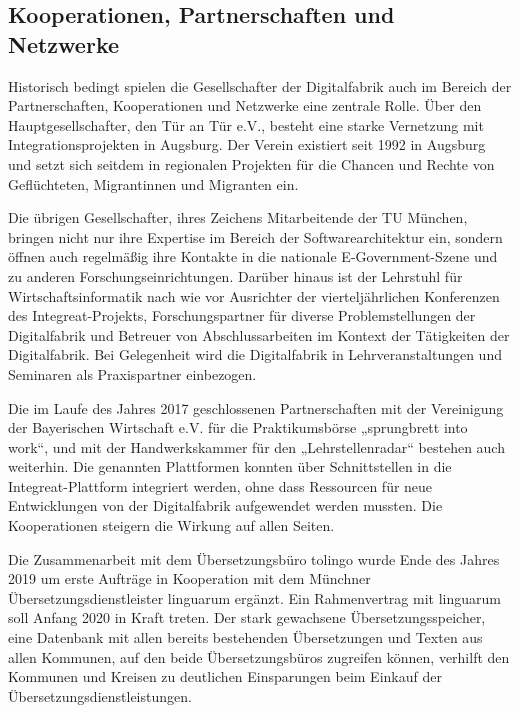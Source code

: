 \documentclass[12pt, a4paper]{article} %
\begin{document}
\hypertarget{kooperationen-partnerschaften-und-netzwerke}{%
\subsection{Kooperationen, Partnerschaften und
Netzwerke}\label{kooperationen-partnerschaften-und-netzwerke}}

Historisch bedingt spielen die Gesellschafter der Digitalfabrik auch im
Bereich der Partnerschaften, Kooperationen und Netzwerke eine zentrale
Rolle. Über den Hauptgesellschafter, den Tür an Tür e.V., besteht eine
starke Vernetzung mit Integrationsprojekten in Augsburg. Der Verein
existiert seit 1992 in Augsburg und setzt sich seitdem in regionalen
Projekten für die Chancen und Rechte von Geflüchteten, Migrantinnen und
Migranten ein.

Die übrigen Gesellschafter, ihres Zeichens Mitarbeitende der TU München,
bringen nicht nur ihre Expertise im Bereich der Softwarearchitektur ein,
sondern öffnen auch regelmäßig ihre Kontakte in die nationale
E-Government-Szene und zu anderen Forschungseinrichtungen. Darüber
hinaus ist der Lehrstuhl für Wirtschaftsinformatik nach wie vor
Ausrichter der vierteljährlichen Konferenzen des Integreat-Projekts,
Forschungspartner für diverse Problemstellungen der Digitalfabrik und
Betreuer von Abschlussarbeiten im Kontext der Tätigkeiten der
Digitalfabrik. Bei Gelegenheit wird die Digitalfabrik in
Lehrveranstaltungen und Seminaren als Praxispartner einbezogen.

Die im Laufe des Jahres 2017 geschlossenen Partnerschaften mit der
Vereinigung der Bayerischen Wirtschaft e.V. für die Praktikumsbörse
„sprungbrett into work“, und mit der Handwerkskammer für den
„Lehrstellenradar“ bestehen auch weiterhin. Die genannten Plattformen
konnten über Schnittstellen in die Integreat-Plattform integriert
werden, ohne dass Ressourcen für neue Entwicklungen von der
Digitalfabrik aufgewendet werden mussten. Die Kooperationen steigern die
Wirkung auf allen Seiten.

Die Zusammenarbeit mit dem Übersetzungsbüro tolingo wurde Ende des
Jahres 2019 um erste Aufträge in Kooperation mit dem Münchner
Übersetzungsdienstleister linguarum ergänzt. Ein Rahmenvertrag mit
linguarum soll Anfang 2020 in Kraft treten. Der stark gewachsene
Übersetzungsspeicher, eine Datenbank mit allen bereits bestehenden
Übersetzungen und Texten aus allen Kommunen, auf den beide
Übersetzungsbüros zugreifen können, verhilft den Kommunen und Kreisen zu
deutlichen Einsparungen beim Einkauf der Übersetzungsdienstleistungen.
\end{document}
